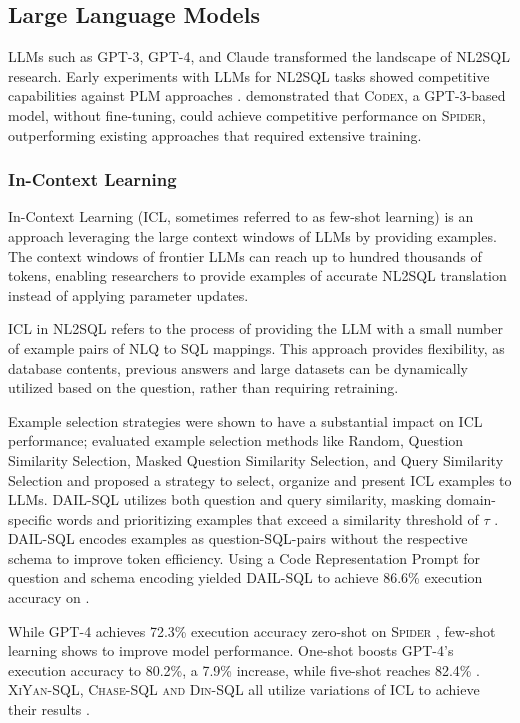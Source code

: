 \subsection{Large Language Models}

LLMs such as GPT-3, GPT-4, and Claude transformed the landscape of NL2SQL
research. Early experiments with LLMs for NL2SQL tasks showed competitive
capabilities against PLM approaches \citep{DAIL-SQL}. \cite{T2SQL-LLM-Bench-3}
demonstrated that \textsc{Codex}, a GPT-3-based model, without fine-tuning,
could achieve competitive performance on \textsc{Spider}, outperforming
existing approaches that required extensive training.

\subsubsection{In-Context Learning}

In-Context Learning (ICL, sometimes referred to as few-shot learning) is an
approach leveraging the large context windows of LLMs by providing examples.
The context windows of frontier LLMs can reach up to hundred thousands of
tokens, enabling researchers to provide examples of accurate NL2SQL translation
instead of applying parameter updates.

ICL in NL2SQL refers to the process of providing the LLM with a small number
of example pairs of NLQ to SQL mappings. This approach provides flexibility, as
database contents, previous answers and large datasets can be dynamically
utilized based on the question, rather than requiring retraining.

Example selection strategies were shown to have a substantial impact on ICL
performance; \cite{DAIL-SQL} evaluated example selection methods like Random,
Question Similarity Selection, Masked Question Similarity Selection, and Query
Similarity Selection and proposed a strategy to select, organize and present
ICL examples to LLMs. DAIL-SQL utilizes both question and query similarity,
masking domain-specific words and prioritizing examples that exceed a
similarity threshold of $\tau$ \citep[p.~5]{DAIL-SQL}. DAIL-SQL encodes
examples as question-SQL-pairs without the respective schema to improve token
efficiency. Using a Code Representation Prompt for question and schema encoding
yielded DAIL-SQL to achieve 86.6\% execution accuracy on \Spider.

While GPT-4 achieves 72.3\% execution accuracy zero-shot on \textsc{Spider}
\citep[Table 1, p.~8]{DAIL-SQL}, few-shot learning shows to improve model
performance. One-shot boosts GPT-4's execution accuracy to 80.2\%, a 7.9\%
increase, while five-shot reaches 82.4\% \citep[Table 2, p.~8]{DAIL-SQL}.
\textsc{XiYan-SQL, Chase-SQL and Din-SQL} all utilize variations of ICL to
achieve their results \citep{XiYan, CHASE, DINSQL}.

